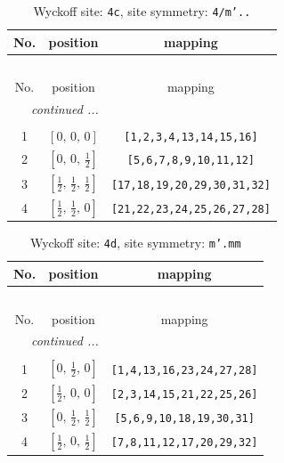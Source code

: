 \documentclass[fleqn,8pt]{jsarticle}
\begin{document}
\renewcommand{\arraystretch}{1.2}
\begin{longtable}{ccc}
\caption{Wyckoff site: {\tt 4c}, site symmetry: {\tt 4/m'..}}
 \\
 \hline \hline
No. & position & mapping \\ \hline \endfirsthead

\multicolumn{2}{l}{\tablename\ \thetable{}} \\
 \hline \hline
No. & position & mapping \\ \hline \endhead

 \hline \hline
\multicolumn{2}{r}{\footnotesize\it continued ...} \\ \endfoot

 \hline \hline
\multicolumn{2}{r}{} \\ \endlastfoot

1 & $\left[ 0,\, 0,\, 0 \right]$ & {\tt [1,2,3,4,13,14,15,16]} \\ \hline
2 & $\left[ 0,\, 0,\, \frac{1}{2} \right]$ & {\tt [5,6,7,8,9,10,11,12]} \\ \hline
3 & $\left[ \frac{1}{2},\, \frac{1}{2},\, \frac{1}{2} \right]$ & {\tt [17,18,19,20,29,30,31,32]} \\ \hline
4 & $\left[ \frac{1}{2},\, \frac{1}{2},\, 0 \right]$ & {\tt [21,22,23,24,25,26,27,28]} \\
\end{longtable}
\renewcommand{\arraystretch}{1.2}
\begin{longtable}{ccc}
\caption{Wyckoff site: {\tt 4d}, site symmetry: {\tt m'.mm}}
 \\
 \hline \hline
No. & position & mapping \\ \hline \endfirsthead

\multicolumn{2}{l}{\tablename\ \thetable{}} \\
 \hline \hline
No. & position & mapping \\ \hline \endhead

 \hline \hline
\multicolumn{2}{r}{\footnotesize\it continued ...} \\ \endfoot

 \hline \hline
\multicolumn{2}{r}{} \\ \endlastfoot

1 & $\left[ 0,\, \frac{1}{2},\, 0 \right]$ & {\tt [1,4,13,16,23,24,27,28]} \\ \hline
2 & $\left[ \frac{1}{2},\, 0,\, 0 \right]$ & {\tt [2,3,14,15,21,22,25,26]} \\ \hline
3 & $\left[ 0,\, \frac{1}{2},\, \frac{1}{2} \right]$ & {\tt [5,6,9,10,18,19,30,31]} \\ \hline
4 & $\left[ \frac{1}{2},\, 0,\, \frac{1}{2} \right]$ & {\tt [7,8,11,12,17,20,29,32]} \\
\end{longtable}
\end{document}
